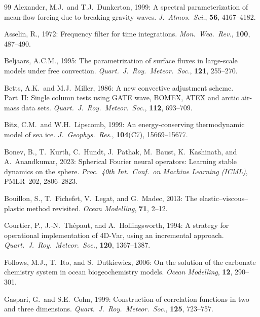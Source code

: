 \documentclass[11pt,twoside]{report}
\begin{document}
\begin{thebibliography}{99}
Alexander, M.J.\ and T.J.~Dunkerton, 1999:
A spectral parameterization of mean-flow forcing due to breaking gravity
waves.
\textit{J.\ Atmos.\ Sci.}, \textbf{56}, 4167--4182.

Asselin, R., 1972:
Frequency filter for time integrations.
\textit{Mon.\ Wea.\ Rev.}, \textbf{100}, 487--490.

Beljaars, A.C.M., 1995:
The parametrization of surface fluxes in large-scale models under free
convection.
\textit{Quart.\ J.\ Roy.\ Meteor.\ Soc.}, \textbf{121}, 255--270.

Betts, A.K.\ and M.J.~Miller, 1986:
A new convective adjustment scheme. Part~II: Single column tests using GATE
wave, BOMEX, ATEX and arctic air-mass data sets.
\textit{Quart.\ J.\ Roy.\ Meteor.\ Soc.}, \textbf{112}, 693--709.

Bitz, C.M.\ and W.H.~Lipscomb, 1999:
An energy-conserving thermodynamic model of sea ice.
\textit{J.\ Geophys.\ Res.}, \textbf{104}(C7), 15669--15677.

Bonev, B., T.~Kurth, C.~Hundt, J.~Pathak, M.~Baust, K.~Kashinath, and
A.~Anandkumar, 2023:
Spherical Fourier neural operators: Learning stable dynamics on the sphere.
\textit{Proc.\ 40th Int.\ Conf.\ on Machine Learning (ICML)}, PMLR~202,
2806--2823.

Bouillon, S., T.~Fichefet, V.~Legat, and G.~Madec, 2013:
The elastic--viscous--plastic method revisited.
\textit{Ocean Modelling}, \textbf{71}, 2--12.

Courtier, P., J.-N.~Th\'epaut, and A.~Hollingsworth, 1994:
A strategy for operational implementation of 4D-Var, using an incremental
approach.
\textit{Quart.\ J.\ Roy.\ Meteor.\ Soc.}, \textbf{120}, 1367--1387.

Follows, M.J., T.~Ito, and S.~Dutkiewicz, 2006:
On the solution of the carbonate chemistry system in ocean biogeochemistry
models.
\textit{Ocean Modelling}, \textbf{12}, 290--301.

Gaspari, G.\ and S.E.~Cohn, 1999:
Construction of correlation functions in two and three dimensions.
\textit{Quart.\ J.\ Roy.\ Meteor.\ Soc.}, \textbf{125}, 723--757.


\end{thebibliography}
\end{document}
